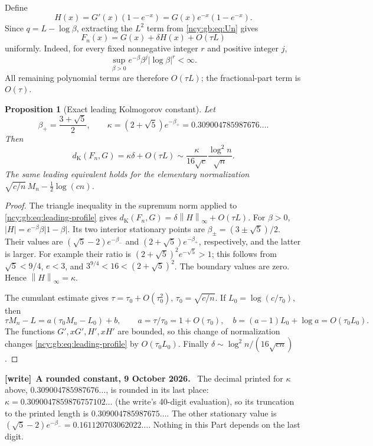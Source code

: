 \documentclass[11pt,letterpaper]{article}
\numberwithin{equation}{section}
\newtheorem{proposition}[theorem]{Proposition}
\theoremstyle{remark}\newtheorem{remark}[theorem]{Remark}
\newenvironment{writenote}[1][]{\par\smallskip\begingroup\small
 \noindent\textbf{[write]}\if\relax\detokenize{#1}\relax\else~\textbf{#1.}\fi\ }%
 {\par\endgroup\smallskip}
\theoremstyle{definition}\newtheorem{definition}[theorem]{Definition}\theoremstyle{plain}
\newcommand{\norminf}[1]{\left\lVert #1\right\rVert_\infty}
\newcommand{\DK}{d_{\mathrm K}}
\begin{document}
Define
\[
 H(x)=G'(x)(1-e^{-x})=G(x)e^{-x}(1-e^{-x}).
\]
Since \(q=L-\log\beta\), extracting the \(L^2\) term from
\eqref{ncy:gb:eq:Un} gives
\begin{equation}\label{ncy:gb:eq:leading-profile}
 F_n(x)=G(x)+\delta H(x)+O(\tau L)
\end{equation}
uniformly. Indeed, for every fixed nonnegative integer \(r\) and
positive integer \(j\),
\[
 \sup_{\beta>0}e^{-\beta}\beta^j|\log\beta|^r<\infty.
\]
All remaining polynomial terms are therefore \(O(\tau L)\);
the fractional-part term is \(O(\tau)\).

\begin{proposition}[Exact leading Kolmogorov constant]\label{ncy:gb:prop:kappa}
Let
\[
 \beta_+=\frac{3+\sqrt5}{2},\qquad
 \kappa=(2+\sqrt5)e^{-\beta_+}=0.309004785987676\ldots.
\]
Then
\begin{equation}\label{ncy:gb:eq:sharp-ordinary}
 \DK(F_n,G)=\kappa\delta+O(\tau L)
 \sim \frac{\kappa}{16\sqrt c}\frac{\log^2 n}{\sqrt n}.
\end{equation}
The same leading equivalent holds for the elementary normalization
\(\sqrt{c/n}\,M_n-\frac12\log(cn)\).
\end{proposition}

\begin{proof}
The triangle inequality in the supremum norm applied to
\eqref{ncy:gb:eq:leading-profile} gives
\(\DK(F_n,G)=\delta\norminf H+O(\tau L)\).
For \(\beta>0\),
\(|H|=e^{-\beta}\beta|1-\beta|\).
Its two interior stationary points are
\(\beta_\pm=(3\pm\sqrt5)/2\). Their values are
\((\sqrt5-2)e^{-\beta_-}\) and
\((2+\sqrt5)e^{-\beta_+}\), respectively, and the latter is larger.
For example their ratio is
\((2+\sqrt5)^2e^{-\sqrt5}>1\);
this follows from \(\sqrt5<9/4\), \(e<3\), and
\(3^{9/4}<16<(2+\sqrt5)^2\).
The boundary values are zero. Hence \(\norminf H=\kappa\).

The cumulant estimate gives
\(\tau=\tau_0+O(\tau_0^2)\), \(\tau_0=\sqrt{c/n}\).
If \(L_0=\log(c/\tau_0)\), then
\[
 \tau M_n-L
 =a(\tau_0M_n-L_0)+b,\qquad
 a=\tau/\tau_0=1+O(\tau_0),\quad
 b=(a-1)L_0+\log a=O(\tau_0L_0).
\]
The functions \(G',xG',H',xH'\) are bounded, so this change of
normalization changes \eqref{ncy:gb:eq:leading-profile} by
\(O(\tau_0L_0)\). Finally
\(\delta\sim\log^2 n/(16\sqrt{cn})\).
\end{proof}
\begin{writenote}[A rounded constant, 9 October 2026]
The decimal printed for $\kappa$ above, $0.309004785987676\ldots$, is rounded
in its last place: $\kappa=0.3090047859876757102\ldots$ (the write's 40-digit
evaluation), so its truncation to the printed length is
$0.309004785987675\ldots$. The other stationary value is
$(\sqrt5-2)e^{-\beta_-}=0.161120703062022\ldots$. Nothing in this Part depends
on the last digit.
\end{writenote}
\end{document}
